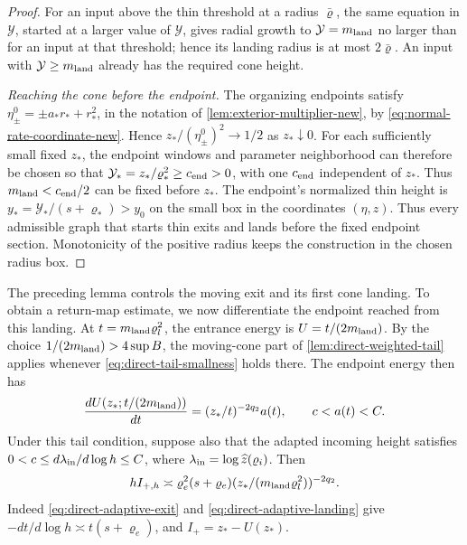 \begin{proof}
For an input above the thin threshold at a radius \(\bar\varrho\), the
same equation in \(\mathcal Y\), started at a larger value of \(\mathcal Y\), gives radial
growth to \(\mathcal Y=m_{\rm land}\) no larger than for an input at that
threshold; hence its landing radius is at most \(2\bar\varrho\).
An input with \(\mathcal Y\ge m_{\rm land}\) already has the required cone height.

\emph{Reaching the cone before the endpoint.}
The organizing endpoints satisfy
\(\eta_\pm^0=\pm a_*r_*+r_*^2\), in the notation of
\cref{lem:exterior-multiplier-new}, by
\eqref{eq:normal-rate-coordinate-new}. Hence
\(z_*/(\eta_\pm^0)^2\to1/2\) as \(z_*\downarrow0\).
For each sufficiently small fixed \(z_*\), the endpoint windows and
parameter neighborhood can therefore be chosen so that
\(\mathcal Y_*=z_*/\varrho_*^2\ge c_{\rm end}>0\), with one
\(c_{\rm end}\) independent of \(z_*\). Thus
\(m_{\rm land}<c_{\rm end}/2\) can be fixed before \(z_*\). The endpoint's normalized thin height is
\(y_*=\mathcal Y_* /(s+\varrho_*)>y_0\) on the small box in the coordinates
\((\eta,z)\).
Thus every admissible graph that starts thin exits and lands before
the fixed endpoint section. Monotonicity of the positive
radius keeps the construction in the chosen radius box.
\end{proof}

The preceding lemma controls the moving exit and its first cone
landing. To obtain a return-map estimate, we now differentiate the
endpoint reached from this landing. At
\(t=m_{\rm land}\varrho_l^2\), the entrance energy is \(U=t/(2m_{\rm land})\).
By the choice \(1/(2m_{\rm land})>4\sup B\), the moving-cone
part of \cref{lem:direct-weighted-tail} applies whenever
\eqref{eq:direct-tail-smallness} holds there. The endpoint energy
then has
\[
 \frac{dU(z_*;t/(2m_{\rm land}))}{dt}
       =(z_*/t)^{-2q_2}a(t),\qquad c<a(t)<C.
\]
Under this tail condition, suppose also that the adapted
incoming height satisfies
\(0<c\le d\lambda_{\rm in}/d\log h\le C\), where
\(\lambda_{\rm in}=\log\widehat z(\varrho_i)\). Then
\begin{equation}
\label{eq:direct-adaptive-source-slope}
 hI_{+,h}\asymp \varrho_e^2(s+\varrho_e)
                    (z_*/(m_{\rm land}\varrho_l^2))^{-2q_2}.
\end{equation}
Indeed \eqref{eq:direct-adaptive-exit} and
\eqref{eq:direct-adaptive-landing} give
\(-dt/d\log h\asymp t(s+\varrho_e)\), and \(I_+=z_*-U(z_*)\).

